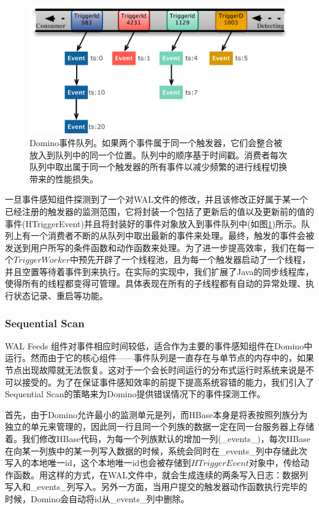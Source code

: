 \begin{figure}[]
\centering
\includegraphics[width=5in]{../figures/queue.pdf}
\caption{Domino事件队列。如果两个事件属于同一个触发器，它们会整合被放入到队列中的同一个位置。队列中的顺序基于时间戳。消费者每次队列中取出属于同一个触发器的所有事件以减少频繁的进行线程切换带来的性能损失。}
\label{figs:queue}
\end{figure}

一旦事件感知组件探测到了一个对WAL文件的修改，并且该修改正好属于某一个已经注册的触发器的监测范围，它将封装一个包括了更新后的值以及更新前的值的事件(HTriggerEvent)并且将封装好的事件对象放入到事件队列中(如图\ref{figs:queue})所示。队列上有一个消费者不断的从队列中取出最新的事件来处理。最终，触发的事件会被发送到用户所写的条件函数和动作函数来处理。为了进一步提高效率，我们在每一个$TriggerWorker$中预先开辟了一个线程池，且为每一个触发器启动了一个线程，并且空置等待着事件到来执行。在实际的实现中，我们扩展了Java的同步线程库，使得所有的线程都变得可管理。具体表现在所有的子线程都有自动的异常处理、执行状态记录、重启等功能。

\subsubsection{Sequential Scan}
WAL Feeds 组件对事件相应时间较低，适合作为主要的事件感知组件在Domino中运行。然而由于它的核心组件——事件队列是一直存在与单节点的内存中的，如果节点出现故障就无法恢复。这对于一个会长时间运行的分布式运行时系统来说是不可以接受的。为了在保证事件感知效率的前提下提高系统容错的能力，我们引入了Sequential Scan的策略来为Domino提供错误情况下的事件探测工作。

首先，由于Domino允许最小的监测单元是列，而HBase本身是将表按照列族分为独立的单元来管理的，因此同一行且同一个列族的数据一定在同一台服务器上存储着。我们修改HBase代码，为每一个列族默认的增加一列(\_events\_)，每次HBase在向某一列族中的某一列写入数据的时候，系统会同时在\_events\_列中存储此次写入的本地唯一id，这个本地唯一id也会被存储到$HTriggerEvent$对象中，传给动作函数。用这样的方式，在WAL文件中，就会生成连续的两条写入日志：数据列写入和\_events\_列写入。另外一方面，当用户提交的触发器动作函数执行完毕的时候，Domino会自动将id从\_events\_列中删除。

